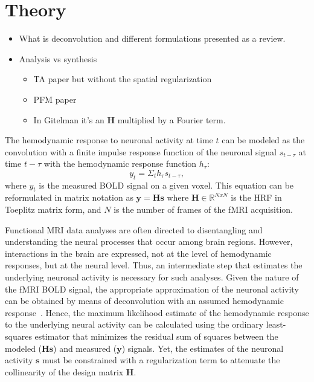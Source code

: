 \section{Theory}

\begin{itemize}
    \item What is deconvolution and different formulations presented as a review.
    \item Analysis vs synthesis
    \begin{itemize}
        \item TA paper but without the spatial regularization
        \item PFM paper
        \item In Gitelman it's an \(\mathbf{H}\) multiplied by a Fourier term.
    \end{itemize}
\end{itemize}

The hemodynamic response to neuronal activity at time \(t\) can be modeled as the convolution with a finite impulse response function of the neuronal signal \(s_{t-\tau}\) at time \(t-\tau\) with the hemodynamic response function \(h_{\tau}\):
\begin{equation}
    \label{eq:gitelman}
    y_t = \Sigma_t h_{\tau} s_{t-\tau},
\end{equation}
where \(y_t\) is the measured BOLD signal on a given voxel. This equation can be reformulated in matrix notation as \(\mathbf{y} = \mathbf{Hs}\) where \(\mathbf{H} \in \mathbb{R}^{NxN}\) is the HRF in Toeplitz matrix form, and \(N\) is the number of frames of the fMRI acquisition.

Functional MRI data analyses are often directed to disentangling and understanding the neural processes that occur among brain regions. However, interactions in the brain are expressed, not at the level of hemodynamic responses, but at the neural level. Thus, an intermediate step that estimates the underlying neuronal activity is necessary for such analyses. Given the nature of the fMRI BOLD signal, the appropriate approximation of the neuronal activity can be obtained by means of deconvolution with an assumed hemodynamic response~\cite{gitelman2003modeling}. Hence, the maximum likelihood estimate of the hemodynamic response to the underlying neural activity can be calculated using the ordinary least-squares estimator that minimizes the residual sum of squares between the modeled (\(\mathbf{Hs}\)) and measured (\(\mathbf{y}\)) signals. Yet, the estimates of the neuronal activity \(\mathbf{s}\) must be constrained with a regularization term to attenuate the collinearity of the design matrix \(\mathbf{H}\).

